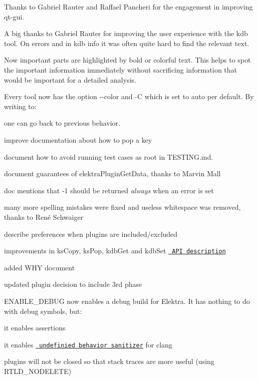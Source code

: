 Thanks to Gabriel Rauter and Raffael Pancheri for the engagement in improving qt-\/gui.

A big thanks to Gabriel Rauter for improving the user experience with the kdb tool. On errors and in {\ttfamily kdb info} it was often quite hard to find the relevant text.

Now important parts are highlighted by bold or colorful text. This helps to spot the important information immediately without sacrificing information that would be important for a detailed analysis.

Every tool now has the option {\ttfamily -\/-\/color} and {\ttfamily -\/C} which is set to {\ttfamily auto} per default. By writing to\+:


\begin{DoxyCode}{0}
\end{DoxyCode}


one can go back to previous behavior.


\begin{DoxyItemize}
\item improve documentation about how to pop a key
\item document how to avoid running test cases as root in T\+E\+S\+T\+I\+NG.md.
\item document guarantees of {\ttfamily elektra\+Plugin\+Get\+Data}, thanks to Marvin Mall
\item doc mentions that -\/1 should be returned {\itshape always} when an error is set
\item many more spelling mistakes were fixed and useless whitespace was removed, thanks to René Schwaiger
\item describe preferences when plugins are included/excluded
\item improvements in {\ttfamily ks\+Copy}, {\ttfamily ks\+Pop}, {\ttfamily kdb\+Get} and {\ttfamily kdb\+Set} \href{https://doc.libelektra.org/api/0.8.17/html/}{\texttt{ A\+PI description}}
\item added W\+HY document
\item updated plugin decision to include 3rd phase
\end{DoxyItemize}

E\+N\+A\+B\+L\+E\+\_\+\+D\+E\+B\+UG now enables a debug build for Elektra. It has nothing to do with debug symbols, but\+:


\begin{DoxyItemize}
\item it enables assertions
\item it enables \href{http://clang.llvm.org/docs/UndefinedBehaviorSanitizer.html}{\texttt{ undefinied behavior sanitizer}} for clang
\item plugins will not be closed so that stack traces are more useful (using {\ttfamily R\+T\+L\+D\+\_\+\+N\+O\+D\+E\+L\+E\+TE})
\end{DoxyItemize}

